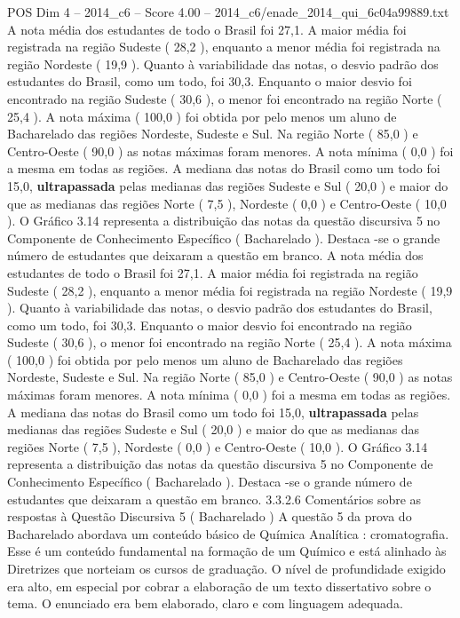 \begin{textsample}{POS Dim 4 – 2014\_c6 – Score 4.00 – 2014\_c6/enade\_2014\_qui\_6c04a99889.txt}
A nota média dos estudantes de todo o Brasil foi 27,1.
A maior média foi registrada na região Sudeste ( 28,2 ), enquanto a menor média foi registrada na região Nordeste ( 19,9 ).
Quanto à variabilidade das notas, o desvio padrão dos estudantes do Brasil, como um todo, foi 30,3.
Enquanto o maior desvio foi encontrado na região Sudeste ( 30,6 ), o menor foi encontrado na região Norte ( 25,4 ).
A nota máxima ( 100,0 ) foi obtida por pelo menos um aluno de Bacharelado das regiões Nordeste, Sudeste e Sul.
Na região Norte ( 85,0 ) e Centro-Oeste ( 90,0 ) as notas máximas foram menores.
A nota mínima ( 0,0 ) foi a mesma em todas as regiões.
A mediana das notas do Brasil como um todo foi 15,0, \textbf{ultrapassada} pelas medianas das regiões Sudeste e Sul ( 20,0 ) e maior do que as medianas das regiões Norte ( 7,5 ), Nordeste ( 0,0 ) e Centro-Oeste ( 10,0 ).
O Gráfico 3.14 representa a distribuição das notas da questão discursiva 5 no Componente de Conhecimento Específico ( Bacharelado ).
Destaca -se o grande número de estudantes que deixaram a questão em branco.
A nota média dos estudantes de todo o Brasil foi 27,1.
A maior média foi registrada na região Sudeste ( 28,2 ), enquanto a menor média foi registrada na região Nordeste ( 19,9 ).
Quanto à variabilidade das notas, o desvio padrão dos estudantes do Brasil, como um todo, foi 30,3.
Enquanto o maior desvio foi encontrado na região Sudeste ( 30,6 ), o menor foi encontrado na região Norte ( 25,4 ).
A nota máxima ( 100,0 ) foi obtida por pelo menos um aluno de Bacharelado das regiões Nordeste, Sudeste e Sul.
Na região Norte ( 85,0 ) e Centro-Oeste ( 90,0 ) as notas máximas foram menores.
A nota mínima ( 0,0 ) foi a mesma em todas as regiões.
A mediana das notas do Brasil como um todo foi 15,0, \textbf{ultrapassada} pelas medianas das regiões Sudeste e Sul ( 20,0 ) e maior do que as medianas das regiões Norte ( 7,5 ), Nordeste ( 0,0 ) e Centro-Oeste ( 10,0 ).
O Gráfico 3.14 representa a distribuição das notas da questão discursiva 5 no Componente de Conhecimento Específico ( Bacharelado ).
Destaca -se o grande número de estudantes que deixaram a questão em branco. 3.3.2.6 Comentários sobre as respostas à Questão Discursiva 5 ( Bacharelado ) A questão 5 da prova do Bacharelado abordava um conteúdo básico de Química Analítica : cromatografia.
Esse é um conteúdo fundamental na formação de um Químico e está alinhado às Diretrizes que norteiam os cursos de graduação.
O nível de profundidade exigido era alto, em especial por cobrar a elaboração de um texto dissertativo sobre o tema.
O enunciado era bem elaborado, claro e com linguagem adequada.

\end{textsample}
